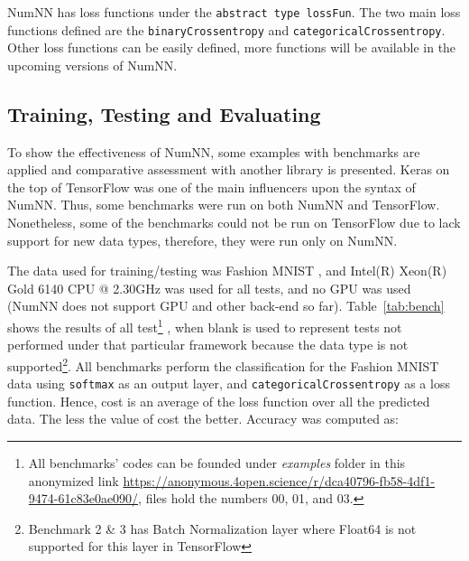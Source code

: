 NumNN has loss functions under the \texttt{abstract type lossFun}. The two main loss functions defined are the \texttt{binaryCrossentropy} and \texttt{categoricalCrossentropy}. Other loss functions can be easily defined, more functions will be available in the upcoming versions of NumNN.


\subsection{Training, Testing and Evaluating}
To show the effectiveness of NumNN, some examples with benchmarks are applied and comparative assessment with another library is presented. Keras \cite{Collet2015} on the top of TensorFlow was one of the main influencers upon the syntax of NumNN. Thus, some benchmarks were run on both NumNN and TensorFlow. Nonetheless, some of the benchmarks could not be run on TensorFlow due to lack support for new data types, therefore, they were run only on NumNN.

The data used for training/testing was Fashion MNIST \cite{Xiao2017}, and Intel(R) Xeon(R) Gold 6140 CPU @ 2.30GHz was used for all tests, and no GPU was used (NumNN does not support GPU and other back-end so far). Table~\ref{tab:bench} shows the results of all test\footnote{All benchmarks' codes can be founded under \emph{examples} folder in this anonymized link \url{https://anonymous.4open.science/r/dca40796-fb58-4df1-9474-61c83e0ae090/}, files hold the numbers 00, 01, and 03.}
, when blank is used to represent tests not performed under that particular framework because the data type is not supported\footnote{\label{batchnorm}Benchmark 2 \& 3 has Batch Normalization layer where Float64 is not supported for this layer in TensorFlow}. All benchmarks perform the classification for the Fashion MNIST data using \texttt{softmax} as an output layer, and \texttt{categoricalCrossentropy} as a loss function. Hence, cost is an average of the loss function over all the predicted data. The less the value of cost the better. Accuracy was computed as:

